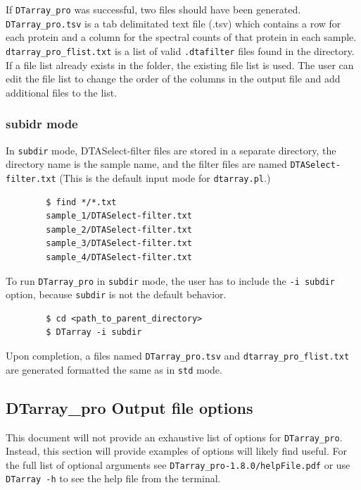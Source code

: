 \documentclass[12pt]{article}
\newcommand{\VERSION}{1.8.0}
\begin{document}
	\noindent
	If \texttt{DTarray\_pro} was successful, two files should have been generated.  \texttt{DTarray\_pro.tsv} is a tab delimitated text file (.tsv) which contains a row for each protein and a column for the spectral counts of that protein in each sample.  \texttt{dtarray\_pro\_flist.txt} is a list of valid \texttt{.dtafilter} files found in the directory.  If a file list already exists in the folder, the existing file list is used.  The user can edit the file list to change the order of the columns in the output file and add additional files to the list.  
	
	\subsubsection{subidr mode}
	
	In \texttt{subdir} mode, DTASelect-filter files are stored in a separate directory, the directory name is the sample name, and the filter files are named \texttt{DTASelect-filter.txt} (This is the default input mode for \texttt{dtarray.pl}.)
	
	\begin{lstlisting}
		$ find */*.txt
		sample_1/DTASelect-filter.txt
		sample_2/DTASelect-filter.txt
		sample_3/DTASelect-filter.txt
		sample_4/DTASelect-filter.txt
	\end{lstlisting}
	
	\noindent
	To run \texttt{DTarray\_pro} in \texttt{subdir} mode, the user has to include the \texttt{-i subdir} option, because \texttt{subdir} is not the default behavior.  
	
	\begin{lstlisting}
		$ cd <path_to_parent_directory>
		$ DTarray -i subdir
	\end{lstlisting}
	
	\noindent
	Upon completion, a files named \texttt{DTarray\_pro.tsv} and \texttt{dtarray\_pro\_flist.txt} are generated formatted the same as in \texttt{std} mode.
	
	\subsection{DTarray\_pro Output file options}
	
	This document will not provide an exhaustive list of options for \texttt{DTarray\_pro}. Instead, this section will provide examples of options will likely find useful.  For the full list of optional arguments see \texttt{DTarray\_pro-\VERSION/helpFile.pdf} or use \texttt{DTarray -h} to see the help file from the terminal.
	
\end{document}
